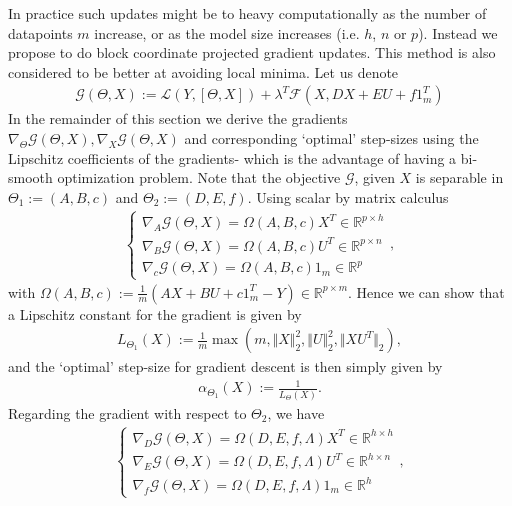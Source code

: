 \documentclass[letterpaper,10pt,english]{sphinxmanual}
\begin{document}
In practice such updates might be to heavy computationally as the number of datapoints \(m\) increase, or
as the model size increases (i.e. \(h\), \(n\) or \(p\)). Instead we propose to do block coordinate projected gradient
updates. This method is also considered to be better at avoiding local minima. Let us denote
\begin{equation*}
\begin{split}\mathcal{G}(\Theta,X) := \mathcal{L}(Y,[\Theta,X]) + \lambda^T \mathcal{F}(X,DX + EU + f1_m^T)\end{split}
\end{equation*}
In the remainder of this section we derive the gradients \(\nabla_{\Theta} \mathcal{G}(\Theta,X), \nabla_X \mathcal{G}(\Theta,X)\) and corresponding ‘optimal’
step-sizes using the Lipschitz coefficients of the gradients- which is the advantage of having a bi-smooth
optimization problem. Note that the objective \(\mathcal{G}\), given \(X\) is separable in \(\Theta_1 := (A,B,c)\) and \(\Theta_2 := (D,E,f)\).
Using scalar by matrix calculus
\begin{equation*}
\begin{split}\begin{cases}
        \nabla_A \mathcal{G}(\Theta,X) = \Omega(A,B,c)X^T \in \mathbb{R}^{p \times h} \\
        \nabla_B \mathcal{G}(\Theta,X) = \Omega(A,B,c)U^T \in \mathbb{R}^{p \times n} \\
\nabla_c \mathcal{G}(\Theta,X) = \Omega(A,B,c)1_m \in \mathbb{R}^p
\end{cases},\end{split}
\end{equation*}
with \(\Omega(A,B,c) := \frac{1}{m}(AX + BU + c1_m^T - Y) \in \mathbb{R}^{p \times m}\). Hence we can show that a Lipschitz constant for the
gradient is given by
\begin{equation*}
\begin{split}L_{\Theta_1}(X) := \frac{1}{m} \max(m,\Vert X \Vert_2^2,\Vert U \Vert_2^2,\Vert XU^T \Vert_2),\end{split}
\end{equation*}
and the ‘optimal’ step-size for gradient descent is then simply given by
\begin{equation*}
\begin{split}\alpha_{\Theta_1}(X) := \frac{1}{L_{\Theta}(X)}.\end{split}
\end{equation*}
Regarding the gradient with respect to \(\Theta_2\), we have
\begin{equation*}
\begin{split}\begin{cases}
        \nabla_D \mathcal{G}(\Theta,X) = \Omega(D,E,f,\Lambda)X^T \in \mathbb{R}^{h \times h} \\
        \nabla_E \mathcal{G}(\Theta,X) = \Omega(D,E,f,\Lambda)U^T \in \mathbb{R}^{h \times n} \\
\nabla_f \mathcal{G}(\Theta,X) = \Omega(D,E,f,\Lambda)1_m \in \mathbb{R}^h
\end{cases},\end{split}
\end{equation*}
\end{document}

